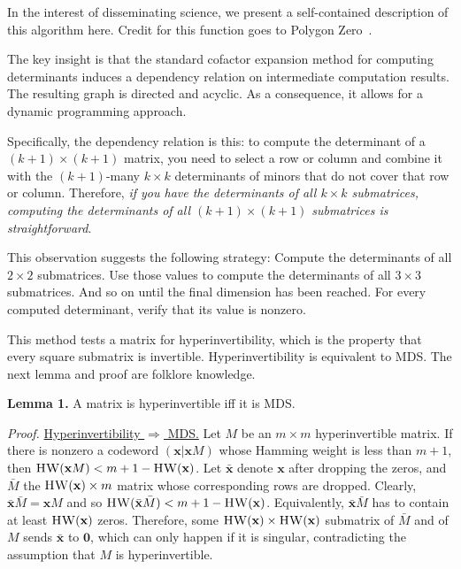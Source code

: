 \documentclass[a4paper]{article}
\begin{document}
In the interest of disseminating science, we present a self-contained description of this algorithm here. Credit for this function goes to Polygon Zero~\cite{polygon-zero}.

The key insight is that the standard cofactor expansion method for computing determinants induces a dependency relation on intermediate computation results. The resulting graph is directed and acyclic. As a consequence, it allows for a dynamic programming approach.

Specifically, the dependency relation is this: to compute the determinant of a $(k+1) \times (k+1)$ matrix, you need to select a row or column and combine it with the $(k+1)$-many $k \times k$ determinants of minors that do not cover that row or column. Therefore, \emph{if you have the determinants of all $k \times k$ submatrices, computing the determinants of all $(k+1) \times (k+1)$ submatrices is straightforward}.

This observation suggests the following strategy: Compute the determinants of all $2 \times 2$ submatrices. Use those values to compute the determinants of all $3 \times 3$ submatrices. And so on until the final dimension has been reached. For every computed determinant, verify that its value is nonzero.

This method tests a matrix for hyperinvertibility, which is the property that every square submatrix is invertible. Hyperinvertibility is equivalent to MDS. The next lemma and proof are folklore knowledge.

\textbf{Lemma 1.} A matrix is hyperinvertible iff it is MDS.

\textit{Proof.} \underline{Hyperinvertibility $\Rightarrow$ MDS.} Let $M$ be an $m \times m$ hyperinvertible matrix. If there is nonzero a codeword $(\mathbf{x} \vert \mathbf{x}M)$ whose Hamming weight is less than $m+1$, then $\textnormal{\textsc{HW}}(\mathbf{x}M) < m+1 - \textnormal{\textsc{HW}}(\mathbf{x})$. Let $\bar{\mathbf{x}}$ denote $\mathbf{x}$ after dropping the zeros, and $\bar{M}$ the $\textnormal{\textsc{HW}}(\mathbf{x}) \times m$ matrix whose corresponding rows are dropped. Clearly, $\bar{\mathbf{x}}\bar{M} = \mathbf{x} M$ and so $\textnormal{\textsc{HW}}(\bar{\mathbf{x}}\bar{M})< m+1 - \textnormal{\textsc{HW}}(\mathbf{x})$. Equivalently, $\bar{\mathbf{x}}\bar{M}$ has to contain at least $\textnormal{\textsc{HW}}(\mathbf{x})$ zeros. Therefore, some $\textnormal{\textsc{HW}}(\mathbf{x}) \times \textnormal{\textsc{HW}}(\mathbf{x})$ submatrix of $\bar{M}$ and of $M$ sends $\bar{\mathbf{x}}$ to $\mathbf{0}$, which can only happen if it is singular, contradicting the assumption that $M$ is hyperinvertible.
\end{document}
